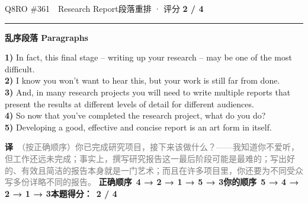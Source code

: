 \documentclass[11pt]{article}
\newcommand{\ptesub}[1]{%
  \par\needspace{2\baselineskip}\smallskip
  {\color{cAccent}\rule[-0.2ex]{3pt}{1.05em}}\hspace{6pt}%
  {\bfseries\color{cHead}#1}\par\nopagebreak\smallskip}
\newcommand{\zh}[1]{{\footnotesize\textcolor{cNote}{\textbf{译}}\ \textcolor{gray}{#1}}}
\begin{document}
\begin{qblock}{Q8\quad RO \#361\ \ Research Report}{段落重排 · 评分 \textcolor{cAccent}{\bfseries 2 / 4}}
\ptesub{乱序段落 Paragraphs}
\begin{promptbox}
\textbf{1)} In fact, this final stage -- writing up your research -- may be one of the most difficult.\\
\textbf{2)} I know you won't want to hear this, but your work is still far from done.\\
\textbf{3)} And, in many research projects you will need to write multiple reports that present the results at different levels of detail for different audiences.\\
\textbf{4)} So now that you've completed the research project, what do you do?\\
\textbf{5)} Developing a good, effective and concise report is an art form in itself.
\end{promptbox}
\zh{（按正确顺序）你已完成研究项目，接下来该做什么？——我知道你不爱听，但工作还远未完成；事实上，撰写研究报告这一最后阶段可能是最难的；写出好的、有效且简洁的报告本身就是一门艺术；而且在许多项目里，你还要为不同受众写多份详略不同的报告。}
\smallskip
\textbf{正确顺序}\ \textcolor{cFix}{\bfseries 4 → 2 → 1 → 5 → 3}\qquad\textbf{你的顺序}\ {\color{cWrong}\bfseries 5 → 4 → 2 → 1 → 3}\qquad\textbf{本题得分：}\ {\color{cAccent}\bfseries 2 / 4}
\end{qblock}
\end{document}

